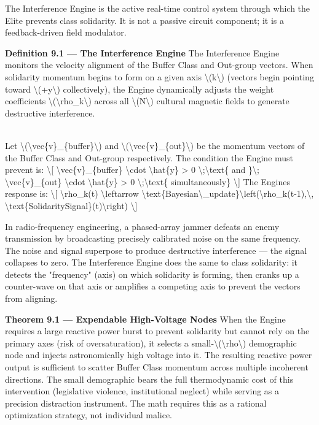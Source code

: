 {The Interference Engine is the active real-time control system through
which the Elite prevents class solidarity. It is not a passive circuit
component; it is a feedback-driven field modulator.

\textbf{Definition 9.1 --- The Interference Engine} The Interference
Engine monitors the velocity alignment of the Buffer Class and Out-group
vectors. When solidarity momentum begins to form on a given axis
\textbackslash(k\textbackslash) (vectors begin pointing toward
\textbackslash(+y\textbackslash) collectively), the Engine dynamically
adjusts the weight coefficients
\textbackslash(\textbackslash rho\_k\textbackslash) across all
\textbackslash(N\textbackslash) cultural magnetic fields to generate
destructive interference.\\
\strut \\
Let \textbackslash(\textbackslash vec\{v\}\_\{buffer\}\textbackslash)
and \textbackslash(\textbackslash vec\{v\}\_\{out\}\textbackslash) be
the momentum vectors of the Buffer Class and Out-group respectively. The
condition the Engine must prevent is: \textbackslash{[}
\textbackslash vec\{v\}\_\{buffer\} \textbackslash cdot
\textbackslash hat\{y\} \textgreater{} 0
\textbackslash;\textbackslash text\{ and \}\textbackslash;
\textbackslash vec\{v\}\_\{out\} \textbackslash cdot
\textbackslash hat\{y\} \textgreater{} 0
\textbackslash;\textbackslash text\{ simultaneously\} \textbackslash{]}
The Engine\textquotesingle s response is: \textbackslash{[}
\textbackslash rho\_k(t) \textbackslash leftarrow
\textbackslash text\{Bayesian\textbackslash\_update\}\textbackslash left(\textbackslash rho\_k(t-1),\textbackslash,
\textbackslash text\{SolidaritySignal\}(t)\textbackslash right)
\textbackslash{]}

In radio-frequency engineering, a phased-array jammer defeats an enemy
transmission by broadcasting precisely calibrated noise on the same
frequency. The noise and signal superpose to produce destructive
interference --- the signal collapses to zero. The Interference Engine
does the same to class solidarity: it detects the "frequency" (axis) on
which solidarity is forming, then cranks up a counter-wave on that axis
or amplifies a competing axis to prevent the vectors from aligning.

\textbf{Theorem 9.1 --- Expendable High-Voltage Nodes} When the Engine
requires a large reactive power burst to prevent solidarity but cannot
rely on the primary axes (risk of oversaturation), it selects a
small-\textbackslash(\textbackslash rho\textbackslash) demographic node
and injects astronomically high voltage into it. The resulting reactive
power output is sufficient to scatter Buffer Class momentum across
multiple incoherent directions. The small demographic bears the full
thermodynamic cost of this intervention (legislative violence,
institutional neglect) while serving as a precision distraction
instrument. The math requires this as a rational optimization strategy,
not individual malice.

}
